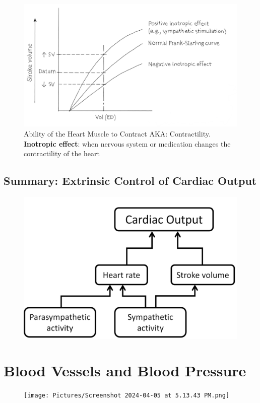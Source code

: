 \documentclass[11pt,fleqn]{book} %
\begin{document}
\begin{figure}[h!]
\begin{center}
    \includegraphics[width=0.6\linewidth]{Pictures/Screenshot 2024-04-04 012911.png}
\end{center}
    \caption{Ability of the Heart Muscle to Contract
AKA: Contractility. \textbf{Inotropic effect}: when nervous
system or medication changes
the contractility of the heart
}
\end{figure}

\newpage
\subsection{Summary: Extrinsic Control of Cardiac Output}
\begin{figure}[h!]
\begin{center}
    \includegraphics[width=0.6\linewidth]{Pictures/Screenshot 2024-04-04 013127.png}
\end{center}
    \caption{}
\end{figure}

\section{Blood Vessels and Blood Pressure}
\begin{figure}[h!]
\begin{center}
    \texttt{[image: Pictures/Screenshot 2024-04-05 at 5.13.43 PM.png]}
\end{center}
    \caption{}
\end{figure}
\end{document}
